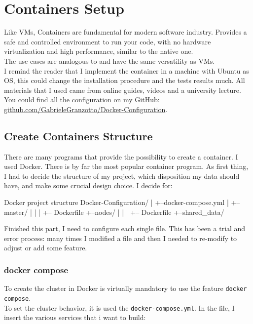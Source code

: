 \chapter{Containers Setup}

Like VMs, Containers are fundamental for modern software industry. Provides a safe and controlled environment to run your code, with no hardware virtualization and high performance, similar to the native one. \\
The use cases are analogous to and have the same versatility as VMs. \\
I remind the reader that I implement the container in a machine with Ubuntu as OS, this could change the installation procedure and the tests results much.
All materials that I used came from online guides, videos and a university lecture. \\
You could find all the configuration on my GitHub: \hyperlink{github.com/GabrieleGranzotto/Docker-Configuration}{github.com/GabrieleGranzotto/Docker-Configuration}.

\section{Create Containers Structure}

There are many programs that provide the possibility to create a container. I used Docker. There is by far the most popular container program.
As first thing, I had to decide the structure of my project, which disposition my data should have, and make some crucial design choice. I decide for:

\begin{codice}[]{Docker project structure}
    Docker-Configuration/
    |
    +--docker-compose.yml
    |
    +--master/
    |  |
    |  +-- Dockerfile
    +--nodes/
    |  |
    |  +-- Dockerfile
    +--shared_data/
\end{codice}

Finished this part, I need to configure each single file. This has been a trial and error process: many times I modified a file and then I needed to re-modify to adjust or add some feature.

\subsection{docker compose}
To create the cluster in Docker is virtually mandatory to use the feature \texttt{docker compose}. \\
To set the cluster behavior, it is used the \texttt{docker-compose.yml}.
In the file, I insert the various services that i want to build:

